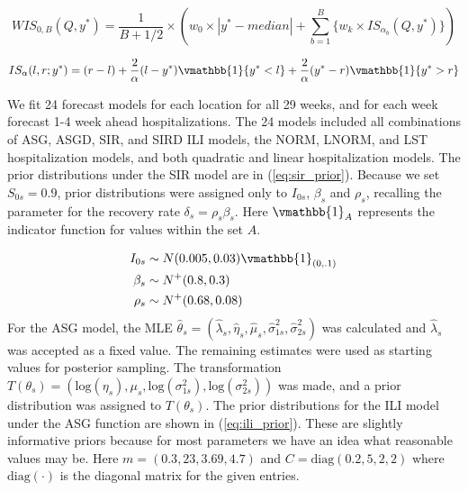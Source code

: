 \documentclass[ba]{imsart}
\theoremstyle{plain}
\theoremstyle{definition}
\theoremstyle{remark}
\begin{document}
\begin{equation}
\label{eq:wis2}
        WIS_{0,B}(Q, y^*) = \frac{1}{B + 1/2} \times (w_0\times |y^* - median| + \sum_{b=1}^B \{w_k \times IS_{\alpha_b}(Q, y^*) \} )
\end{equation}

\begin{equation}
\label{eq:is}
        IS_{\alpha}(l,r;y^*) = (r-l) + \frac{2}{\alpha}(l - y^*)\vmathbb{1}\{y^* < l\} + \frac{2}{\alpha}(y^* - r) \vmathbb{1}\{y^* > r\}
\end{equation}


We fit 24 forecast models for each location for all 29 weeks, and for each week forecast 1-4 week ahead hospitalizations. The 24 models included all combinations of ASG, ASGD, SIR, and SIRD ILI models, the NORM, LNORM, and LST hospitalization models, and both quadratic and linear hospitalization models. 
The prior distributions under the SIR model are in (\ref{eq:sir_prior}). Because we set $S_{0s} = 0.9$, prior distributions were assigned only to $I_{0s}$, $\beta_s$ and $\rho_s$, recalling the parameter for the recovery rate $\delta_s = \rho_s \beta_s$. Here $\vmathbb{1}_{A}$ represents the indicator function for values within the set $A$.

\begin{equation}
\begin{aligned}
    \label{eq:sir_prior}
        I_{0s} &\sim N(0.005, 0.03) \vmathbb{1}_{(0, .1)} \\
        \beta_s &\sim N^+(0.8, 0.3) \\
        \rho_s &\sim N^+(0.68, 0.08)
\end{aligned}
\end{equation}
For the ASG model, the MLE $\hat{\theta}_s = (\hat{\lambda}_s, \hat{\eta}_s, \hat{\mu}_s, \hat{\sigma}_{1s}^2, \hat{\sigma}_{2s}^2)$ was calculated and $\hat{\lambda}_s$ was accepted as a fixed value. The remaining estimates were used as starting values for posterior sampling. The transformation $T(\theta_s) = (\text{log}(\eta_s), \mu_s, \text{log}(\sigma_{1s}^2), \text{log}(\sigma_{2s}^2))$ was made, and a prior distribution was assigned to $T(\theta_s)$.
The prior distributions for the ILI model under the ASG function are shown in (\ref{eq:ili_prior}). These are slightly informative priors because for most parameters we have an idea what reasonable values may be. Here $m = (0.3, 23, 3.69, 4.7)$ and $C = \text{diag}(0.2, 5, 2, 2)$
where $\text{diag}(\cdot)$ 
is the diagonal matrix for the given entries.
\end{document}

